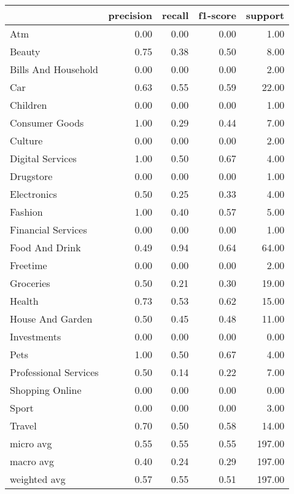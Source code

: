 \begin{tabular}{lrrrr}
\toprule
{} &  precision &  recall &  f1-score &  support \\
\midrule
Atm                   &       0.00 &    0.00 &      0.00 &     1.00 \\
Beauty                &       0.75 &    0.38 &      0.50 &     8.00 \\
Bills And Household   &       0.00 &    0.00 &      0.00 &     2.00 \\
Car                   &       0.63 &    0.55 &      0.59 &    22.00 \\
Children              &       0.00 &    0.00 &      0.00 &     1.00 \\
Consumer Goods        &       1.00 &    0.29 &      0.44 &     7.00 \\
Culture               &       0.00 &    0.00 &      0.00 &     2.00 \\
Digital Services      &       1.00 &    0.50 &      0.67 &     4.00 \\
Drugstore             &       0.00 &    0.00 &      0.00 &     1.00 \\
Electronics           &       0.50 &    0.25 &      0.33 &     4.00 \\
Fashion               &       1.00 &    0.40 &      0.57 &     5.00 \\
Financial Services    &       0.00 &    0.00 &      0.00 &     1.00 \\
Food And Drink        &       0.49 &    0.94 &      0.64 &    64.00 \\
Freetime              &       0.00 &    0.00 &      0.00 &     2.00 \\
Groceries             &       0.50 &    0.21 &      0.30 &    19.00 \\
Health                &       0.73 &    0.53 &      0.62 &    15.00 \\
House And Garden      &       0.50 &    0.45 &      0.48 &    11.00 \\
Investments           &       0.00 &    0.00 &      0.00 &     0.00 \\
Pets                  &       1.00 &    0.50 &      0.67 &     4.00 \\
Professional Services &       0.50 &    0.14 &      0.22 &     7.00 \\
Shopping Online       &       0.00 &    0.00 &      0.00 &     0.00 \\
Sport                 &       0.00 &    0.00 &      0.00 &     3.00 \\
Travel                &       0.70 &    0.50 &      0.58 &    14.00 \\
micro avg             &       0.55 &    0.55 &      0.55 &   197.00 \\
macro avg             &       0.40 &    0.24 &      0.29 &   197.00 \\
weighted avg          &       0.57 &    0.55 &      0.51 &   197.00 \\
\bottomrule
\end{tabular}
